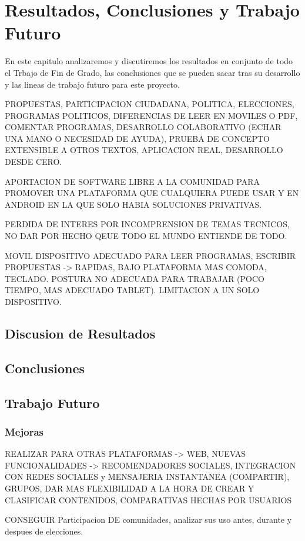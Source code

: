 \newpage
\thispagestyle{sectioned}
\chapter{Resultados, Conclusiones y Trabajo Futuro}

En este capitulo analizaremos y discutiremos los resultados en conjunto de todo el Trbajo de Fin de Grado, las conclusiones que se pueden sacar tras su desarrollo y las lineas de trabajo futuro para este proyecto.

PROPUESTAS, PARTICIPACION CIUDADANA, POLITICA, ELECCIONES, PROGRAMAS POLITICOS, DIFERENCIAS DE LEER EN MOVILES O PDF, COMENTAR PROGRAMAS, DESARROLLO COLABORATIVO (ECHAR UNA MANO O NECESIDAD DE AYUDA), PRUEBA DE CONCEPTO EXTENSIBLE A OTROS TEXTOS, APLICACION REAL, DESARROLLO DESDE CERO. 

APORTACION DE SOFTWARE LIBRE A LA COMUNIDAD PARA PROMOVER UNA PLATAFORMA QUE CUALQUIERA PUEDE USAR Y EN ANDROID EN LA QUE SOLO HABIA SOLUCIONES PRIVATIVAS.

PERDIDA DE INTERES POR INCOMPRENSION DE TEMAS TECNICOS, NO DAR POR HECHO QEUE TODO EL MUNDO ENTIENDE DE TODO.

MOVIL DISPOSITIVO ADECUADO PARA LEER PROGRAMAS, ESCRIBIR PROPUESTAS -> RAPIDAS, BAJO PLATAFORMA MAS COMODA, TECLADO. POSTURA NO ADECUADA PARA TRABAJAR (POCO TIEMPO, MAS ADECUADO TABLET). LIMITACION A UN SOLO DISPOSITIVO.

\section{Discusion de Resultados}

\section{Conclusiones}

\section{Trabajo Futuro}

\subsection{Mejoras}

REALIZAR PARA OTRAS PLATAFORMAS -> WEB, NUEVAS FUNCIONALIDADES -> RECOMENDADORES SOCIALES, INTEGRACION CON REDES SOCIALES y MENSAJERIA INSTANTANEA (COMPARTIR), GRUPOS, DAR MAS FLEXIBILIDAD A LA HORA DE CREAR Y CLASIFICAR CONTENIDOS, COMPARATIVAS HECHAS POR USUARIOS

CONSEGUIR Participacion DE comunidades, analizar sus uso antes, durante y despues de elecciones.


